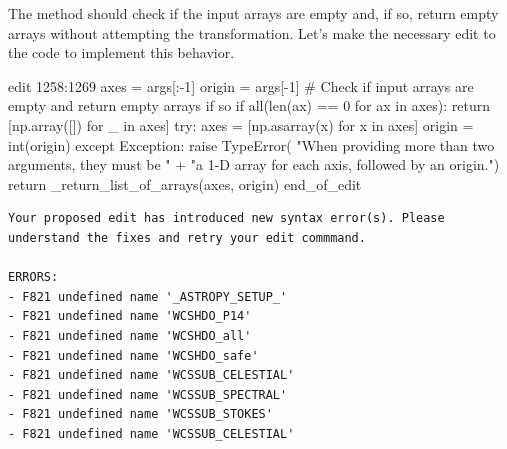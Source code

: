 {\begin{agentbox}
The method should check if the input arrays are empty and, if so, return empty arrays without attempting the transformation. Let's make the necessary edit to the code to implement this behavior.



\hrulefill
\begin{CodeVerbatim}[breaklines=true, breakanywhere=true]
edit 1258:1269
            axes = args[:-1]
            origin = args[-1]
            # Check if input arrays are empty and return empty arrays if so
            if all(len(ax) == 0 for ax in axes):
                return [np.array([]) for _ in axes]
            try:
                axes = [np.asarray(x) for x in axes]
                origin = int(origin)
            except Exception:
                raise TypeError(
                    "When providing more than two arguments, they must be " +
                    "a 1-D array for each axis, followed by an origin.")
            return _return_list_of_arrays(axes, origin)
end_of_edit
\end{CodeVerbatim}
\end{agentbox}
\begin{observationbox}\begin{Verbatim}[breaklines=true, breakanywhere=true]
Your proposed edit has introduced new syntax error(s). Please understand the fixes and retry your edit commmand.

ERRORS:
- F821 undefined name '_ASTROPY_SETUP_'
- F821 undefined name 'WCSHDO_P14'
- F821 undefined name 'WCSHDO_all'
- F821 undefined name 'WCSHDO_safe'
- F821 undefined name 'WCSSUB_CELESTIAL'
- F821 undefined name 'WCSSUB_SPECTRAL'
- F821 undefined name 'WCSSUB_STOKES'
- F821 undefined name 'WCSSUB_CELESTIAL'


\end{Verbatim}
\end{observationbox}}
